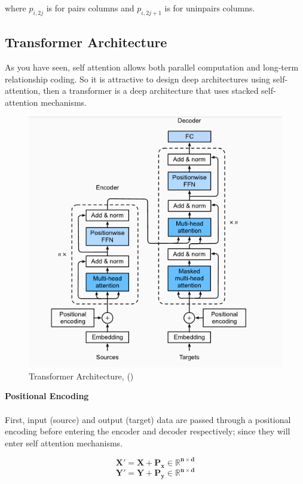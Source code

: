 where $p_{i,2j}$ is for pairs columns and $p_{i,2j+1}$ is for uninpairs columns.


\subsection{Transformer Architecture}


As you have seen, self attention allows both parallel computation and long-term relationship coding. So it is attractive to design deep architectures using self-attention, then a transformer is a deep architecture that uses stacked self-attention mechanisms.

\begin{figure}[h!]
    \centering%
    \includegraphics[width=\linewidth]{Figures/background/Transformer.png}
    \caption{Transformer Architecture, (\cite{goodfellow2016dive})}
    \label{fig:attention}
\end{figure}

\newpage
\textbf{Positional Encoding}
\\\\
First, input (source) and output (target) data are passed through a positional encoding before entering the encoder and decoder respectively; since they will enter self attention mechanisms.

\begin{equation}
    \mathbf{X}'=\mathbf{X}+\mathbf{P_{x}  \in \mathbb{R}^{n \times d}}
\end{equation}
\begin{equation}
    \mathbf{Y}'=\mathbf{Y}+\mathbf{P_{y}  \in \mathbb{R}^{n \times d}}
\end{equation}

